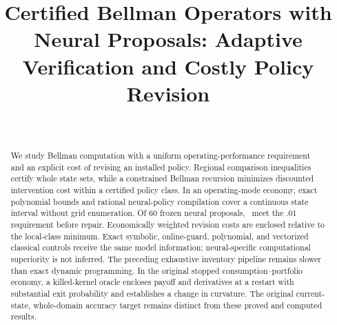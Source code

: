 

\begin{frontmatter}
\title{Certified Bellman Operators with Neural Proposals: Adaptive Verification and Costly Policy Revision}
\begin{aug}\author[id=au1,addressref={add1}]{~}\address[id=add1]{}\end{aug}
\begin{abstract}We study Bellman computation with a uniform operating-performance requirement and an explicit cost of revising an installed policy. Regional comparison inequalities certify whole state sets, while a constrained Bellman recursion minimizes discounted intervention cost within a certified policy class. In an operating-mode economy, exact polynomial bounds and rational neural-policy compilation cover a continuous state interval without grid enumeration. Of 60 frozen neural proposals, \RThirtyRawPass\ meet the .01 requirement before repair. Economically weighted revision costs are enclosed relative to the local-class minimum. Exact symbolic, online-guard, polynomial, and vectorized classical controls receive the same model information; neural-specific computational superiority is not inferred. The preceding exhaustive inventory pipeline remains slower than exact dynamic programming. In the original stopped consumption--portfolio economy, a killed-kernel oracle encloses payoff and derivatives at a restart with substantial exit probability and establishes a change in curvature. The original current-state, whole-domain accuracy target remains distinct from these proved and computed results.\end{abstract}
\begin{keyword}\end{keyword}
\end{frontmatter}

\clearpage

